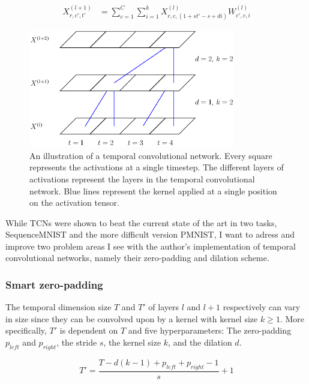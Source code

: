 \documentclass[a4paper, twoside]{article}
\begin{document}
\begin{equation}
\begin{split}
	X^{(l+1)}_{r, c', t'}	
		& = \sum^{C}_{c=1} \sum^{k}_{i=1} X^{(l)}_{r, c, (1 + st'-s+di)}W^{(l)}_{c', c, i}
\end{split}
\end{equation}

\begin{figure}[h]
\begin{center}
    \includegraphics[width=9cm]{figTCNdil.eps}\caption{An illustration of a temporal convolutional network. Every square represents the activations at a single timestep. The different layers of activations represent the layers in the temporal convolutional network. Blue lines represent the kernel applied at a single position on the activation tensor.} 
    
    \label{figTCNdil}
\end{center}
\end{figure}

While TCNs \cite{tcn} were shown to beat the current state of the art in two tasks, SequenceMNIST and the more difficult version PMNIST, I want to adress and improve two problem areas I see with the author's implementation of temporal convolutional networks, namely their zero-padding and dilation scheme.

\subsubsection{Smart zero-padding}
The temporal dimension size $T$ and $T'$ of layers $l$ and $l+1$ respectively can vary in size since they can be convolved upon by a kernel with kernel size $k \geq 1$. More specifically, $T'$ is dependent on $T$ and five hyperparameters: The zero-padding $p_{left}$ and $p_{right}$, the stride $s$, the kernel size $k$, and the dilation $d$.

\begin{equation}
T' = \frac{T-d(k-1)+p_{left}+p_{right}-1}{s}+1
\end{equation}
\end{document}
